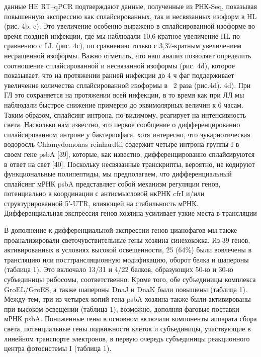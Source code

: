 \documentclass[a4paper,12pt]{article}
\begin{document}
            \par{данные HE RT–qPCR подтверждают данные, полученные из РНК-Seq, показывая повышенную экспрессию как
            сплайсированных, так и несвязанных изоформ в HL (рис. 4b, c). Это увеличение особенно выражено в
            сплайсированной изоформе во время поздней инфекции, где мы наблюдали 10,6-кратное увеличение HL по
            сравнению с LL (рис. 4с), по сравнению только с 3,37-кратным увеличением несращенной изоформы. Важно
            отметить, что наш анализ позволяет определить соотношение сплайсированной и несвязанной изоформы (рис. 4d),
            которое показывает, что на протяжении ранней инфекции до 4 ч фаг поддерживает увеличение количества
            сплайсированной изоформы в ~2 раза (рис.4d). 4d). При ГЛ это сохраняется на протяжении всей инфекции, в то
            время как при ЛЛ мы наблюдали быстрое снижение примерно до эквимолярных величин к 6 часам. Таким образом,
            сплайсинг интрона, по-видимому, реагирует на интенсивность света. Насколько нам известно, это первое
            сообщение о дифференцированно сплайсированном интроне у бактериофага, хотя интересно, что эукариотическая
            водоросль Chlamydomonas reinhardtii содержит четыре интрона группы I в своем гене psbA [39], которые, как
            известно, дифференцированно сплайсируются в ответ на свет [40]. Поскольку несвязанные транскрипты,
            вероятно, не кодируют функциональные полипептиды, мы предполагаем, что дифференциальный сплайсинг мРНК psbA
            представляет собой механизм регуляции генов, потенциально в координации с антисмысловой нкРНК cfrI и/или
            структурированной 5'-UTR, влияющей на стабильность мРНК.}\\
            {\Large Дифференциальная экспрессия генов хозяина усиливает узкие места в трансляции}
            \par{В дополнение к дифференциальной экспрессии генов цианофагов мы также проанализировали
            светочувствительные гены хозяина синехококка. Из 39 генов, активированных в условиях высокой освещенности,
            25 (64\%) были вовлечены в трансляцию или посттрансляционную модификацию, оборот белка и шапероны (таблица
            1). Это включало 13/31 и 4/22 белков, образующих 50-ю и 30-ю субъединицы рибосомы, соответственно. Кроме
            того, обе субъединицы комплекса GroEL/GroES, а также шапероны DnaJ и DnaK были повышены (таблица 1). Между
            тем, три из четырех копий гена psbA хозяина также были активированы при высоком освещении (таблица 1),
            возможно, дополняя фаговые поставки мРНК psbA. Пониженные гены в основном включали компоненты аппарата
            сбора света, потенциальные гены подвижности клеток и субъединицы, участвующие в линейном транспорте
            электронов, в первую очередь субъединицы реакционного центра фотосистемы I (таблица 1).}
\end{document}

